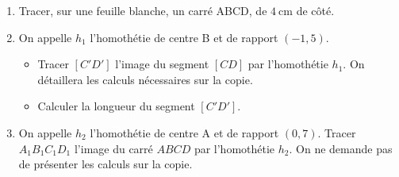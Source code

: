 \begin{minipage}{0.99\linewidth}

\exo

\begin{enumerate}

\item Tracer, sur une feuille blanche, un carré ABCD, de $4~\text{cm}$ de côté.

\item On appelle $h_1$ l'homothétie de centre B et de rapport $(-1,5)$.

\begin{itemize}

\item Tracer $[C'D']$ l'image du segment $[CD]$ par l'homothétie $h_1$. On détaillera les calculs nécessaires sur la copie.

\item Calculer la longueur du segment $[C'D']$.

\end{itemize}

\item On appelle $h_2$ l'homothétie de centre A et de rapport $(0,7)$. Tracer $A_1B_1C_1D_1$ l'image du carré $ABCD$ par l'homothétie $h_2$. On ne demande pas de présenter les calculs sur la copie. 

\end{enumerate}
 
\end{minipage}

\vspace{0.5cm}
